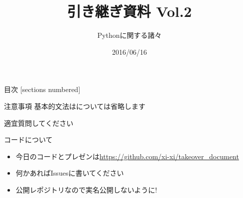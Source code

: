 \documentclass[12pt, dvipdfmx]{beamer}
\title{引き継ぎ資料 Vol.2}
\subtitle{Pythonに関する諸々}
\date{2016/06/16}
\author{}
\institute{}
\begin{document}
\maketitle
\begin{frame}{目次}
  [sections numbered]
  \tableofcontents[hideallsubsections]
\end{frame}
\begin{frame}{注意事項}
    基本的文法はについては\alert{省略}します

    適宜質問してください
\end{frame}
\begin{frame}{コードについて}
    \begin{itemize}
        \item 今日のコードとプレゼンは\url{https://github.com/xi-xi/takeover_document}

        \item \alert{何かあればIssuesに書いてください}
        \item 公開レポジトリなので実名公開しないように!
    \end{itemize}
\end{frame}
\end{document}
